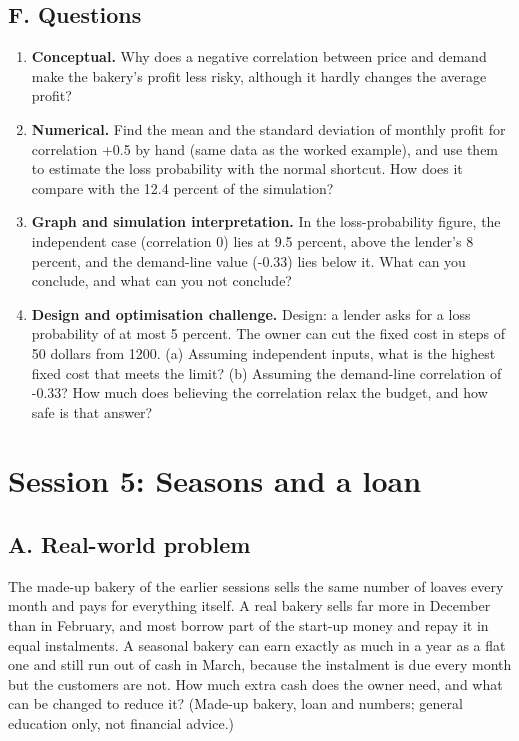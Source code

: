 \documentclass[11pt,a4paper]{article}
\begin{document}
\subsection*{F. Questions}
\begin{enumerate}[nosep]
\item \textbf{Conceptual.} Why does a negative correlation between price and demand make the bakery's profit less risky, although it hardly changes the average profit?
\item \textbf{Numerical.} Find the mean and the standard deviation of monthly profit for correlation +0.5 by hand (same data as the worked example), and use them to estimate the loss probability with the normal shortcut. How does it compare with the 12.4 percent of the simulation?
\item \textbf{Graph and simulation interpretation.} In the loss-probability figure, the independent case (correlation 0) lies at 9.5 percent, above the lender's 8 percent, and the demand-line value (-0.33) lies below it. What can you conclude, and what can you not conclude?
\item \textbf{Design and optimisation challenge.} Design: a lender asks for a loss probability of at most 5 percent. The owner can cut the fixed cost in steps of 50 dollars from 1200. (a) Assuming independent inputs, what is the highest fixed cost that meets the limit? (b) Assuming the demand-line correlation of -0.33? How much does believing the correlation relax the budget, and how safe is that answer?
\end{enumerate}

\section{Session 5: Seasons and a loan}

\subsection*{A. Real-world problem}
The made-up bakery of the earlier sessions sells the same number of loaves every month and pays for everything itself. A real bakery sells far more in December than in February, and most borrow part of the start-up money and repay it in equal instalments. A seasonal bakery can earn exactly as much in a year as a flat one and still run out of cash in March, because the instalment is due every month but the customers are not. How much extra cash does the owner need, and what can be changed to reduce it? (Made-up bakery, loan and numbers; general education only, not financial advice.)
\end{document}
